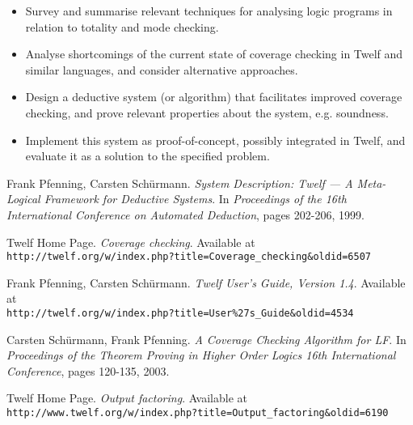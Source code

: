 \documentclass[12pt]{article}
\begin{document}
\begin{itemize}
	\item Survey and summarise relevant techniques for analysing logic programs in relation to totality and mode checking.
  \item Analyse shortcomings of the current state of coverage checking in Twelf and similar languages, and consider alternative approaches.
  \item Design a deductive system (or algorithm) that facilitates improved coverage checking, and prove relevant properties about the system, e.g. soundness.
  \item Implement this system as proof-of-concept, possibly integrated in Twelf, and evaluate it as a solution to the specified problem.
\end{itemize}

\begin{thebibliography}{9}

Frank Pfenning, Carsten Sch\"{u}rmann.
\textit{System Description: Twelf --- A Meta-Logical Framework for Deductive Systems}.
In \textit{Proceedings of the 16th International Conference on Automated Deduction}, pages 202-206, 1999.

Twelf Home Page.
\textit{Coverage checking}.
Available at \\
\verb|http://twelf.org/w/index.php?title=Coverage_checking&oldid=6507|

Frank Pfenning, Carsten Sch\"{u}rmann.
\textit{Twelf User's Guide, Version 1.4}.
Available at \\
\verb|http://twelf.org/w/index.php?title=User%27s_Guide&oldid=4534|

Carsten Sch\"{u}rmann, Frank Pfenning.
\textit{A Coverage Checking Algorithm for LF}.
In \textit{Proceedings of the Theorem Proving in Higher Order Logics 16th International Conference}, pages 120-135, 2003.

Twelf Home Page.
\textit{Output factoring}.
Available at \\
\verb|http://www.twelf.org/w/index.php?title=Output_factoring&oldid=6190|

\end{thebibliography}
\end{document}
